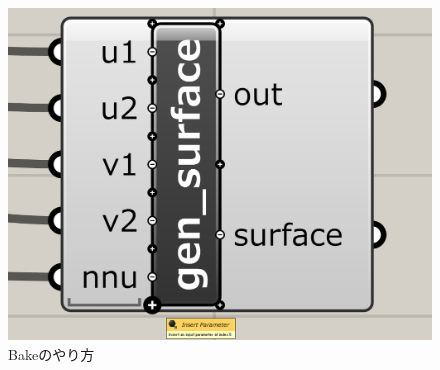 \documentclass[11pt]{jarticle}
\begin{document}
\begin{figure}[H]
  \centering
    \includegraphics[width=0.8\linewidth]{fig/insert_parameter.png}
    \caption{Bakeのやり方}
  \label{fig:scanipflow}
\end{figure}
\end{document}
